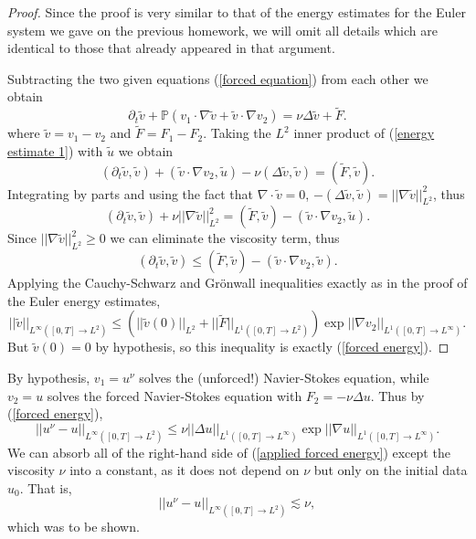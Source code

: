 \documentclass[10pt]{article}
\newcommand{\PP}{\mathbb P}
\theoremstyle{definition}
\begin{document}
\begin{proof}
Since the proof is very similar to that of the energy estimates for the Euler system we gave on the previous homework, we will omit all details which are identical to those that already appeared in that argument.

Subtracting the two given equations (\ref{forced equation}) from each other we obtain
\begin{equation}
\label{energy estimate 1}
\partial_t \tilde v + \PP(v_1 \cdot \nabla \tilde v + \tilde v \cdot \nabla v_2) = \nu \Delta \tilde v + \tilde F.
\end{equation}
where $\tilde v = v_1 - v_2$ and $\tilde F = F_1 - F_2$.
Taking the $L^2$ inner product of (\ref{energy estimate 1}) with $\tilde u$ we obtain
$$(\partial_t \tilde v, \tilde v) + (\tilde v \cdot \nabla v_2, \tilde u) - \nu(\Delta \tilde v, \tilde v) = (\tilde F, \tilde v).$$
Integrating by parts and using the fact that $\nabla \cdot \tilde v = 0$, $-(\Delta \tilde v, \tilde v) = ||\nabla \tilde v||_{L^2}^2$, thus
$$(\partial_t \tilde v, \tilde v) + \nu||\nabla \tilde v||_{L^2}^2 = (\tilde F, \tilde v) - (\tilde v \cdot \nabla v_2, \tilde u).$$
Since $||\nabla \tilde v||_{L^2}^2 \geq 0$ we can eliminate the viscosity term, thus
$$(\partial_t \tilde v, \tilde v) \leq (\tilde F, \tilde v) - (\tilde v \cdot \nabla v_2, \tilde v).$$
Applying the Cauchy-Schwarz and Gr\"onwall inequalities exactly as in the proof of the Euler energy estimates,
$$||\tilde v||_{L^\infty([0, T] \to L^2)} \leq (||\tilde v(0)||_{L^2} + ||\tilde F||_{L^1([0, T] \to L^2)}) \exp ||\nabla v_2||_{L^1([0, T] \to L^\infty)}.$$
But $\tilde v(0) = 0$ by hypothesis, so this inequality is exactly (\ref{forced energy}).
\end{proof}

By hypothesis, $v_1 = u^\nu$ solves the (unforced!) Navier-Stokes equation, while $v_2 = u$ solves the forced Navier-Stokes equation with $F_2 = -\nu \Delta u$. Thus by (\ref{forced energy}),
\begin{equation}
\label{applied forced energy}
||u^\nu - u||_{L^\infty([0, T] \to L^2)} \leq \nu ||\Delta u||_{L^1([0, T] \to L^\infty)} \exp ||\nabla u||_{L^1([0, T] \to L^\infty)}.
\end{equation}
We can absorb all of the right-hand side of (\ref{applied forced energy}) except the viscosity $\nu$ into a constant, as it does not depend on $\nu$ but only on the initial data $u_0$. That is,
$$||u^\nu - u||_{L^\infty([0, T] \to L^2)} \lesssim \nu,$$
which was to be shown.
\end{document}
